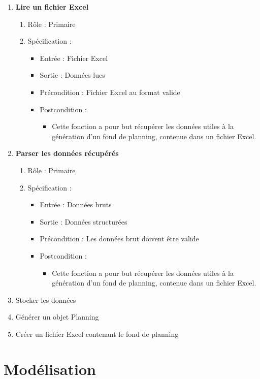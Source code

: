 \documentclass{polytech/polytech}
\begin{document}
	\begin{enumerate}
		\item \textbf{Lire un fichier Excel}
		\begin{enumerate}
			\item Rôle :  Primaire
			\item Spécification :
			\begin{itemize}
				\item Entrée : Fichier Excel
				\item Sortie : Données lues
				\item Précondition : Fichier Excel au format valide
				\item Postcondition :
				\begin{itemize}[label=\textbullet, font=\LARGE]
					\item Cette fonction a pour but récupérer les données utiles à la génération d'un fond de planning, contenue dans un fichier Excel.
				\end{itemize}
			\end{itemize}
		\end{enumerate}
		\item \textbf{Parser les données récupérés}
		\begin{enumerate}
			\item Rôle :  Primaire
			\item Spécification :
			\begin{itemize}
				\item Entrée : Données bruts
				\item Sortie : Données structurées
				\item Précondition : Les données brut doivent être valide
				\item Postcondition :
				\begin{itemize}[label=\textbullet, font=\LARGE]
					\item Cette fonction a pour but récupérer les données utiles à la génération d'un fond de planning, contenue dans un fichier Excel.
				\end{itemize}
			\end{itemize}
		\end{enumerate}
		\item Stocker les données
		\item Générer un objet Planning
		\item Créer un fichier Excel contenant le fond de planning 
	\end{enumerate}

	\section{Modélisation}
\end{document}
